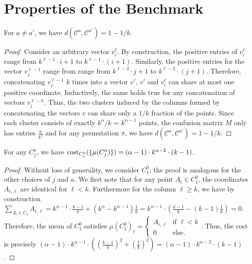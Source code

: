 \section{Properties of the Benchmark}

\begin{fact}
For $a\neq a'$, we have $d(\mathcal{C}^{a},\mathcal{C}^{a'}) = 1-1/k$.
\end{fact}
\begin{proof}
Consider an arbitrary vector $v_i^{\ell}$. By construction, the positive entries of $v_i^{\ell}$ range from $k^{\ell-1}\cdot i+1$ to $k^{\ell-1}\cdot (i+1)$. Similarly, the positive entries for the vector $v_j^{\ell-1}$ range from range from $k^{\ell-2}\cdot j+1$ to $k^{\ell-2}\cdot (j+1)$. Therefore, concatenating $v_j^{\ell-1}$ $k$ times into a vector $v'$, $v'$ and $v_i^{\ell}$ can share at most one positive coordinate. Inductively, the same holds true for any concatenation of vectors $v_j^{\ell-h}$.
Thus, the two clusters induced by the columns formed by concatenating the vectors $v$ can share only a $1/k$ fraction of the points. Since each cluster consists of exactly $k^{\alpha}/k$ = $k^{\alpha-1}$ points, the confusion matrix $M$ only has entries $\frac{n}{k^2}$ and for any permutation $\pi$, we have $d(\mathcal{C}^{a},\mathcal{C}^{a'}) = 1-1/k$.
\end{proof}

\begin{fact}
\label{fact:cost}
For any $C_j^a$, we have $\text{cost}_{C_j^a}(\{\mu(C_j^a)\}) = (\alpha-1)\cdot k^{\alpha-2}\cdot (k-1)$.
\end{fact}
\begin{proof}
Without loss of generality, we consider $C_1^0$; the proof is analogous for the other choices of $j$ and $a$. We first note that for any point $A_i \in C_1^0$, the coordinates $A_{i,\ell}$ are identical for $\ell <k$. Furthermore for the column $\ell\geq k$, we have by construction $\sum_{A_i\in C_j} A_{i,\ell} = k^{\alpha-1}\cdot \frac{k-1}{k} + (k^{\alpha}-k^{\alpha-1})\frac{1}{k}=k^{\alpha-1}\cdot (\frac{k-1}{k} - (k-1)\frac{1}{k}) = 0.$ Therefore, the mean of $C_1^0$ satisfies $\mu(C_1^0)_{\ell} = \begin{cases}A_{i,\ell} &\text{if }\ell<k \\
0 &\text{else.}\end{cases}$. 
Thus, the cost is precisely $(\alpha-1)\cdot k^{\alpha-1}\cdot \left(\left(\frac{k-1}{k}\right)^2 + \left(\frac{1}{k}\right)^2 \right)=(\alpha-1)\cdot k^{\alpha-2}\cdot (k-1)$.
\end{proof}

